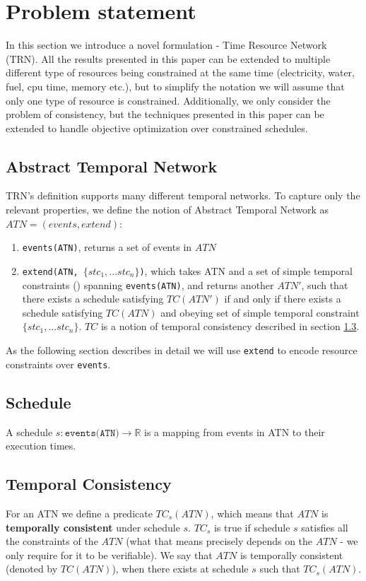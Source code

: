 \section{Problem statement}
In this section we introduce a novel formulation - Time Resource Network (TRN). All the results presented in this paper can be extended to multiple different type of resources being constrained at the same time (electricity, water, fuel, cpu time, memory etc.), but to simplify the notation we will assume that only one type of resource is constrained. Additionally, we only consider the problem of consistency, but the techniques presented in this paper can be extended to handle objective optimization over constrained schedules.

\subsection{Abstract Temporal Network}
TRN's definition supports many different temporal networks. To capture only the relevant properties, we define the notion of Abstract Temporal Network as $ATN=(events,extend)$:
\begin{enumerate}
\item \texttt{events(ATN)}, returns a set of events in $ATN$
\item \texttt{extend(ATN, $\{ stc_1, ... stc_n \} $)}, which takes ATN and a set of simple temporal constraints (\cite{dechter1991temporal}) spanning \texttt{events(ATN)}, and returns another $ATN'$, such that there exists a schedule satisfying $TC(ATN')$ if and only if there exists a schedule satisfying $TC(ATN)$ and obeying set of simple temporal constraint $\{ stc_1, ... stc_n \} $. $TC$ is a notion of temporal consistency described in section \ref{temporal_consistency}.
\end{enumerate}
As the following section describes in detail we will use \texttt{extend} to encode resource constraints over \texttt{events}.
\subsection{Schedule}
A schedule $s: \texttt{events(ATN)} \rightarrow \mathbb{R}$ is a mapping from events in ATN to their execution times.
\subsection{Temporal Consistency}
\label{temporal_consistency}
For an ATN we define a predicate $TC_s(ATN)$, which means that $ATN$ is \textbf{temporally consistent} under schedule $s$. $TC_s$ is true if schedule $s$ satisfies all the constraints of the $ATN$ (what that means precisely depends on the $ATN$ - we only require for it to be verifiable). We say that $ATN$ is temporally consistent (denoted by $TC(ATN)$), when there exists at schedule $s$ such that $TC_s(ATN)$.


